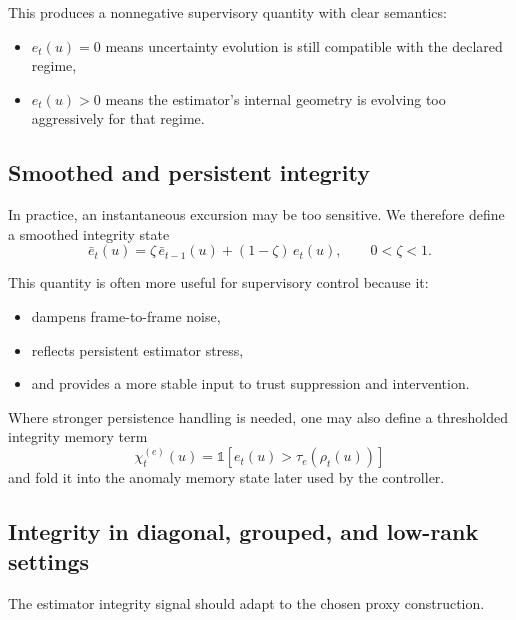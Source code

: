 \documentclass[11pt,letterpaper]{article}
\theoremstyle{gcresult}
\theoremstyle{definition}
\begin{document}
This produces a nonnegative supervisory quantity with clear semantics:
\begin{itemize}[leftmargin=1.5em]
    \item $e_t(u)=0$ means uncertainty evolution is still compatible with the declared regime,
    \item $e_t(u)>0$ means the estimator’s internal geometry is evolving too aggressively for that regime.
\end{itemize}


\subsection{Smoothed and persistent integrity}

In practice, an instantaneous excursion may be too sensitive. We therefore define a smoothed integrity state
\begin{equation}
\bar e_t(u)=\zeta\,\bar e_{t-1}(u)+(1-\zeta)\,e_t(u),
\qquad 0<\zeta<1.
\end{equation}

This quantity is often more useful for supervisory control because it:
\begin{itemize}[leftmargin=1.5em]
    \item dampens frame-to-frame noise,
    \item reflects persistent estimator stress,
    \item and provides a more stable input to trust suppression and intervention.
\end{itemize}

Where stronger persistence handling is needed, one may also define a thresholded integrity memory term
\begin{equation}
\chi^{(e)}_t(u)=\mathbb{1}\!\left[e_t(u)>\tau_e(\rho_t(u))\right]
\end{equation}
and fold it into the anomaly memory state later used by the controller.


\subsection{Integrity in diagonal, grouped, and low-rank settings}

The estimator integrity signal should adapt to the chosen proxy construction.
\end{document}
